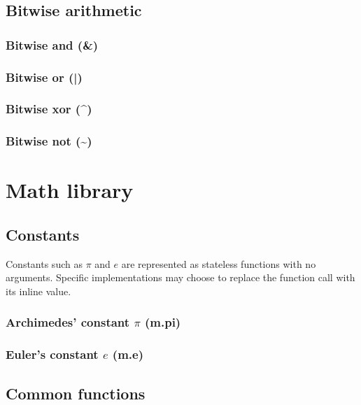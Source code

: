 \documentclass{article}
\theoremstyle{definition}
\begin{document}
\subsection{Bitwise arithmetic}

\subsubsection{Bitwise and (\&)}

\subsubsection{Bitwise or (|)}

\subsubsection{Bitwise xor (\^{})}

\subsubsection{Bitwise not (\textasciitilde{})}

\pagebreak

\section{Math library}

\subsection{Constants}

Constants such as $\pi$ and $e$ are represented as stateless functions with no arguments.  Specific implementations may choose to replace the function call with its inline value.

\subsubsection{Archimedes' constant $\pi$ (m.pi)}

\subsubsection{Euler's constant $e$ (m.e)}

\subsection{Common functions}
\end{document}
